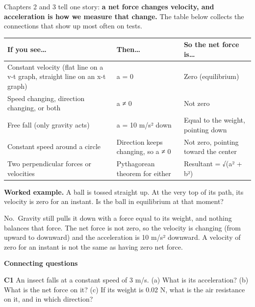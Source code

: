 \documentclass[
]{article}
\newcounter{none} %
\begin{document}
Chapters 2 and 3 tell one story: \textbf{a net force changes velocity,
and acceleration is how we measure that change.} The table below
collects the connections that show up most often on tests.

{\def\LTcaptype{none} %
\begin{longtable}[]{@{}
  >{\raggedright\arraybackslash}p{}
  >{\raggedright\arraybackslash}p{}
  >{\raggedright\arraybackslash}p{}@{}}
\toprule\noalign{}
\begin{minipage}[b]{\linewidth}\raggedright
If you see\ldots{}
\end{minipage} & \begin{minipage}[b]{\linewidth}\raggedright
Then\ldots{}
\end{minipage} & \begin{minipage}[b]{\linewidth}\raggedright
So the net force is\ldots{}
\end{minipage} \\
\midrule\noalign{}
\endhead
\bottomrule\noalign{}
\endlastfoot
Constant velocity (flat line on a v-t graph, straight line on an x-t
graph) & a = 0 & Zero (equilibrium) \\
Speed changing, direction changing, or both & a ≠ 0 & Not zero \\
Free fall (only gravity acts) & a = 10 m/s² down & Equal to the weight,
pointing down \\
Constant speed around a circle & Direction keeps changing, so a ≠ 0 &
Not zero, pointing toward the center \\
Two perpendicular forces or velocities & Pythagorean theorem for either
& Resultant = √(a² + b²) \\
\end{longtable}
}

\textbf{Worked example.} A ball is tossed straight up. At the very top
of its path, its velocity is zero for an instant. Is the ball in
equilibrium at that moment?

No.~Gravity still pulls it down with a force equal to its weight, and
nothing balances that force. The net force is not zero, so the velocity
is changing (from upward to downward) and the acceleration is 10 m/s²
downward. A velocity of zero for an instant is not the same as having
zero net force.

\textbf{Connecting questions}

\textbf{C1} An insect falls at a constant speed of 3 m/s. (a) What is
its acceleration? (b) What is the net force on it? (c) If its weight is
0.02 N, what is the air resistance on it, and in which direction?
\end{document}
